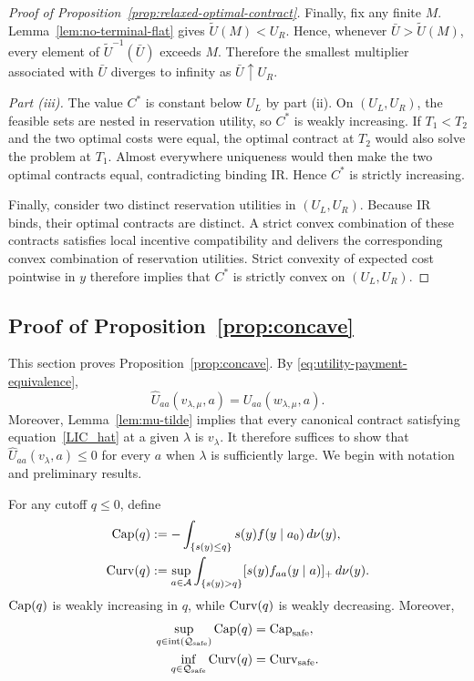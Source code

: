 \begin{proof}[Proof of Proposition~\ref{prop:relaxed-optimal-contract}]
Finally, fix any finite $M$.  Lemma~\ref{lem:no-terminal-flat} gives
$\widetilde U(M)<U_R$.  Hence, whenever
$\bar U>\widetilde U(M)$, every element of
$\widetilde U^{-1}(\bar U)$ exceeds $M$.  Therefore the smallest multiplier associated with $\bar U$ diverges to
infinity as $\bar U\uparrow U_R$.

\emph{Part (iii).}  The value $C^*$ is constant below $U_L$ by part (ii).
On $(U_L,U_R)$, the feasible sets are nested in reservation utility, so
$C^*$ is weakly increasing.  If $T_1<T_2$ and the two optimal costs were
equal, the optimal contract at $T_2$ would also solve the problem at $T_1$.
Almost everywhere uniqueness would then make the two optimal contracts equal,
contradicting binding IR.  Hence $C^*$ is strictly increasing.

Finally, consider two distinct reservation utilities in $(U_L,U_R)$.  Because
IR binds, their optimal contracts are distinct.  A strict convex combination
of these contracts satisfies local incentive compatibility and delivers the corresponding convex
combination of reservation utilities.  Strict convexity of expected cost pointwise in $y$
therefore implies that $C^*$ is strictly convex on $(U_L,U_R)$.
\end{proof}

\subsection{Proof of Proposition~\ref{prop:concave}}
\label{subsec:appendix-safe-tail}

This section proves Proposition~\ref{prop:concave}.  By
\eqref{eq:utility-payment-equivalence},
\[
    \widehat U_{aa}(v_{\lambda,\mu},a)
    =U_{aa}(w_{\lambda,\mu},a).
\]
Moreover, Lemma~\ref{lem:mu-tilde} implies that every canonical contract
satisfying equation~\eqref{LIC_hat} at a given $\lambda$ is $v_\lambda$.  It therefore suffices to
show that $\widehat U_{aa}(v_\lambda,a)\leq0$ for every $a$ when $\lambda$ is
sufficiently large. We begin with notation and preliminary results.

For any cutoff $q\leq0$, define
\begin{align}
    \mathrm{Cap}(q)&:=-\int_{\{s(y)\leq q\}}s(y)f(y\mid a_0)\,d\nu(y),
    \label{eq:cutoff-capacity}\\
    \mathrm{Curv}(q)&:=\sup_{a\in\mathcal A}
    \int_{\{s(y)>q\}}[s(y)f_{aa}(y\mid a)]_+\,d\nu(y).
    \label{eq:cutoff-curvature}
\end{align}
$\mathrm{Cap}(q)$ is weakly increasing in $q$, while
$\mathrm{Curv}(q)$ is weakly decreasing.
Moreover,
\begin{align}
 \sup_{q\in\operatorname{int}(\mathcal Q_{\mathrm{safe}})}\mathrm{Cap}(q)
 &=\mathrm{Cap}_{\mathrm{safe}},
 \label{eq:cutoff-capacity-limit}\\
 \inf_{q\in\mathcal Q_{\mathrm{safe}}}\mathrm{Curv}(q)
 &=\mathrm{Curv}_{\mathrm{safe}}.
 \label{eq:cutoff-curvature-limit}
\end{align}

